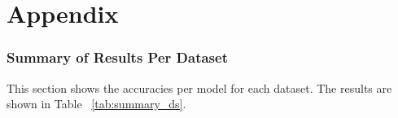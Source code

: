 \chapter{Appendix}
\subsection{Summary of Results Per Dataset}
This section shows the accuracies per model for each dataset. The results are shown in Table ~\ref{tab:summary_ds}.
